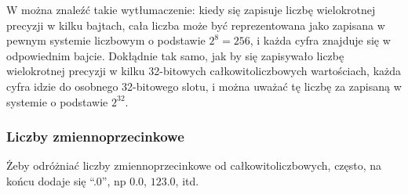 W  można znaleźć takie wytłumaczenie: kiedy się zapisuje liczbę wielokrotnej precyzji w kilku bajtach,
cała liczba może być reprezentowana jako zapisana w pewnym systemie liczbowym o podstawie $2^8=256$, i każda cyfra znajduje się w odpowiednim bajcie.
Dokłądnie tak samo, jak by się zapisywało liczbę wielokrotnej precyzji w kilku 32-bitowych całkowitoliczbowych wartościach,
każda cyfra idzie do osobnego 32-bitowego slotu, i można uważać tę liczbę za zapisaną w systemie o podstawie $2^{32}$.


\subsubsection{Liczby zmiennoprzecinkowe}

Żeby odróżniać liczby zmiennoprzecinkowe od całkowitoliczbowych, często, na końcu dodaje się ``.0'',
np $0.0$, $123.0$, itd.



